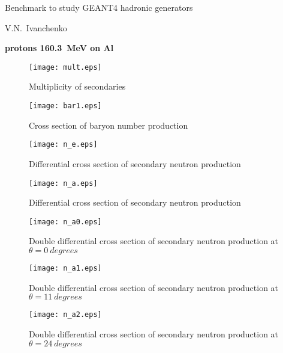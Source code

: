 \documentclass[12pt]{article}
\begin{document}
\pagestyle{empty}

\begin{center}
{\large Benchmark to study GEANT4 hadronic generators} 

\vspace*{5mm}
V.N.~Ivanchenko

\vspace*{5mm}


\vspace*{5mm}

{\bf protons 160.3~MeV on Al} 

\vspace*{5mm}


\end{center}

\begin{figure}[htbp]
\caption{Multiplicity of secondaries}
\label{fig1a}  
\centerline{\texttt{[image: mult.eps]}}
\end{figure}
\begin{figure}[htbp]
\caption{Cross section of baryon number production}
\label{fig1b}  
\centerline{\texttt{[image: bar1.eps]}}
\end{figure}

\begin{figure}[htbp]
\caption{Differential cross section of secondary neutron production}
\label{fig7}  
\centerline{\texttt{[image: n\_e.eps]}}
\end{figure}
\begin{figure}[htbp]
\caption{Differential cross section of secondary neutron production}
\label{fig10} 
\centerline{\texttt{[image: n\_a.eps]}}
\end{figure}

\clearpage


\begin{figure}[htbp]
\caption{Double differential cross section of secondary neutron production at $\theta = 0~degrees$}
\label{figa0} 
\centerline{\texttt{[image: n\_a0.eps]}}
\end{figure}


\begin{figure}[htbp]
\caption{Double differential cross section of secondary neutron production at $\theta = 11~degrees$}
\label{figa1} 
\centerline{\texttt{[image: n\_a1.eps]}}
\end{figure}

\begin{figure}[htbp]
\caption{Double differential cross section of secondary neutron production at $\theta = 24~degrees$}
\label{figa2} 
\centerline{\texttt{[image: n\_a2.eps]}}
\end{figure}
\end{document}
